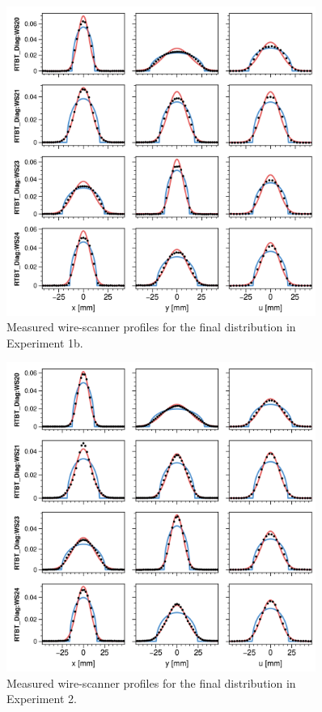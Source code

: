 \begin{figure}[!p]
    \centering
    \includegraphics[width=0.9\textwidth]{Images/chapter5/exp1b/fits_9.png}
    \caption{Measured wire-scanner profiles for the final distribution in Experiment 1b.}
    \label{fig:exp1b_fits}
\end{figure}
%
\begin{figure}[!p]
    \centering
    \includegraphics[width=0.9\textwidth]{Images/chapter5/exp2/fits_9.png}
    \caption{Measured wire-scanner profiles for the final distribution in Experiment 2.}
    \label{fig:exp2_fits}
\end{figure}
